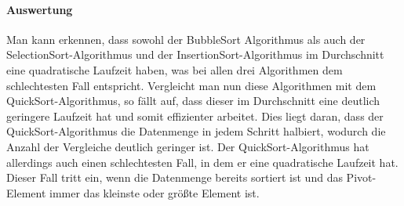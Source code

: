 \documentclass[../entry.tex]{subfiles}
\begin{document}
    \paragraph{Auswertung}
    Man kann erkennen, dass sowohl der BubbleSort Algorithmus als auch der SelectionSort-Algorithmus
    und der InsertionSort-Algorithmus im Durchschnitt eine quadratische Laufzeit haben, was bei allen
    drei Algorithmen dem schlechtesten Fall entspricht.
    Vergleicht man nun diese Algorithmen mit dem QuickSort-Algorithmus, so fällt auf, dass dieser
    im Durchschnitt eine deutlich geringere Laufzeit hat und somit effizienter arbeitet.
    Dies liegt daran, dass der QuickSort-Algorithmus die Datenmenge in jedem Schritt halbiert,
    wodurch die Anzahl der Vergleiche deutlich geringer ist.
    Der QuickSort-Algorithmus hat allerdings auch einen schlechtesten Fall, in dem er eine quadratische Laufzeit hat.
    Dieser Fall tritt ein, wenn die Datenmenge bereits sortiert ist und das Pivot-Element immer das kleinste oder größte Element ist.
\end{document}
